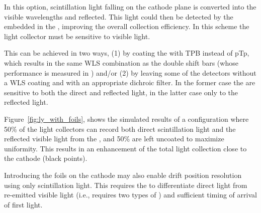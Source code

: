 In this option, scintillation light falling on the cathode plane is converted into the visible wavelengths and reflected. This light %
could then be detected by the  embedded in the , improving the overall collection efficiency. In this scheme the light collector must be sensitive to visible light. 

This can be achieved in two ways, (1) by coating the  with TPB instead of pTp, which results in the same WLS combination as the double shift bars (whose performance is measured in )
and/or (2) by leaving some of the  detectors without a  
WLS coating and with an appropriate dichroic filter. In the former case the   are sensitive to both the direct and reflected light, in the latter case only to the reflected light. 

Figure~\ref{fig:ly_with_foils}, shows the simulated results of a configuration where 50\% of the  light collectors can %
record both direct scintillation light and the reflected visible light from the ,  and 50\% are left uncoated to maximize uniformity. This results in an enhancement of the total light collection close to the cathode (black points). %

Introducing the foils on the cathode may also enable drift position resolution using only scintillation light. This requires the  to  
differentiate direct  light from re-emitted visible light (i.e., requires two 
types of ) and 
sufficient timing of arrival of first light.

